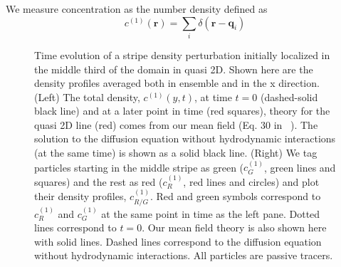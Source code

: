 \documentclass[twoside,openright,titlepage,numbers=noenddot,%
headinclude,footinclude,cleardoublepage=empty,abstract=on,
BCOR=5mm,fontsize=11pt, dvipsnames, paper=b5
]{scrreprt}
\renewcommand{\vec}[1]{\bm{#1}}
\newcommand{\ppos}{q}
\newcommand{\fpos}{r}
\begin{document}
We measure concentration as the number density defined as
\begin{equation}
  c^{(1)}(\vec{\fpos}) = \sum_i\delta(\vec{\fpos}-\vec{\ppos}_i)
\end{equation}
\begin{figure}[H]
  \centering
  \hspace*{-2.0cm}
  \caption[ ]{Time evolution of a stripe density perturbation initially localized in the middle third of the domain in quasi 2D. Shown here are the density profiles averaged both in ensemble and in the x direction. (Left) The total density, $c^{(1)}(y, t)$, at time $t=0$ (dashed-solid black line) and at a later point in time (red squares), theory for the quasi 2D line (red) comes from our mean field (Eq. 30 in ~\cite{Pelaez2018}). The solution to the diffusion equation without hydrodynamic interactions (at the same time) is shown as a solid black line. (Right) We tag particles starting in the middle stripe as green ($c^{(1)}_G$, green lines and squares) and the rest as red ($c^{(1)}_R$, red lines and circles) and plot their density profiles, $c^{(1)}_{R/G}$. Red and green symbols correspond to $c^{(1)}_R$ and $c^{(1)}_G$ at the same point in time as the left pane. Dotted lines correspond to $t=0$. Our mean field theory is also shown here with solid lines. Dashed lines correspond to the diffusion equation without hydrodynamic interactions. All particles are passive tracers.}
  \label{fig:q2Doverdens}
\end{figure}
\end{document}
